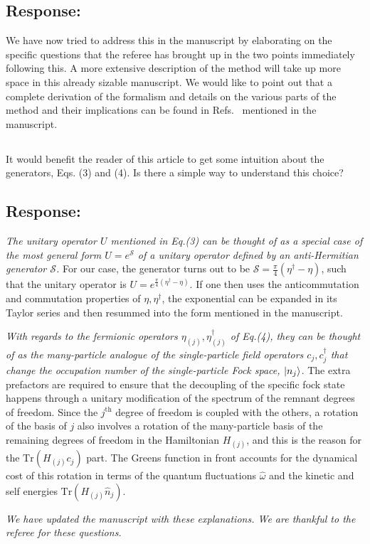 \documentclass[11pt]{article}
\newcommand{\response}[1]{{\color{blue}\subsection*{Response:}{#1}}}
\newcommand{\point}[1]{\subsection{}{#1}}
\begin{document}
\response{We have now tried to address this in the manuscript by elaborating on the specific questions that the referee has brought up in the two points immediately following this. A more extensive description of the method will take up more space in this already sizable manuscript. We would like to point out that a complete derivation of the formalism and details on the various parts of the method and their implications can be found in Refs.~\cite{anirbanurg1,anirbanurg2} mentioned in the manuscript.}


\point{
It would benefit the reader of this article to get some intuition about the generators, Eqs. (3) and (4). Is there a simple way to understand this choice?}

\response{
	{\it The unitary operator \(U\) mentioned in Eq.(3) can be thought of as a special case of the most general form \(U = e^\mathcal{S}\) of a unitary operator defined by an anti-Hermitian generator \(\mathcal{S}\).} For our case, the generator turns out to be \(\mathcal{S} = \frac{\pi}{4}\left( \eta^\dagger - \eta \right) \), such that the unitary operator is \(U = e^{\frac{\pi}{4}\left(\eta^\dagger - \eta\right) }\). If one then uses the anticommutation and commutation properties of \(\eta,\eta^\dagger\), the exponential can be expanded in its Taylor series and then resummed into the form mentioned in the manuscript.

	{\it With regards to the fermionic operators \(\eta_{(j)},\eta^\dagger_{(j)}\) of Eq.(4), they can be thought of as the many-particle analogue of the single-particle field operators \(c_j,c^\dagger_j\) that change the occupation number of the single-particle Fock space, \(\ket{n_j}\)}. The extra prefactors are required to ensure that the decoupling of the specific fock state happens through a unitary modification of the spectrum of the remnant degrees of freedom. Since the \(j^\text{th}\) degree of freedom is coupled with the others, a rotation of the basis of \(j\) also involves a rotation of the many-particle basis of the remaining degrees of freedom in the Hamiltonian \(H_{(j)}\), and this is the reason for the \(\text{Tr}\left(H_(j) c_j\right) \) part. The Greens function in front accounts for the dynamical cost of this rotation in terms of the quantum fluctuations \(\hat \omega\) and the kinetic and self energies \(\text{Tr}\left( H_{(j)}\hat n_j \right) \).

	{\it We have updated the manuscript with these explanations. We are thankful to the referee for these questions.}
}
\end{document}

